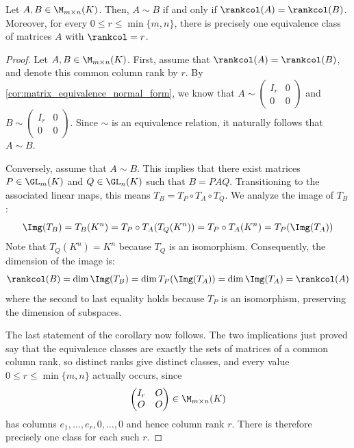 \begin{corollary}
\label{cor:matrix_rank_equivalence_classification}
Let $A, B \in \M_{m \times n}(K)$. Then, $A \sim B$ if and only if $\rankcol(A) = \rankcol(B)$. Moreover, for every $0 \le r \le \min\{m, n\}$, there is precisely one equivalence class of matrices $A$ with $\rankcol = r$.
\end{corollary}

\begin{proof}
Let $A, B \in \M_{m \times n}(K)$. First, assume that $\rankcol(A) = \rankcol(B)$, and denote this common column rank by $r$. By \cref{cor:matrix_equivalence_normal_form}, we know that $A \sim \left(\begin{smallmatrix} I_r & 0 \\ 0 & 0 \end{smallmatrix}\right)$ and $B \sim \left(\begin{smallmatrix} I_r & 0 \\ 0 & 0 \end{smallmatrix}\right)$. Since $\sim$ is an equivalence relation, it naturally follows that $A \sim B$.

Conversely, assume that $A \sim B$. This implies that there exist matrices $P \in \GL_m(K)$ and $Q \in \GL_n(K)$ such that $B = PAQ$. Transitioning to the associated linear maps, this means $T_B = T_P \circ T_A \circ T_Q$. We analyze the image of $T_B$:
\begin{equation*}
    \Img(T_B) = T_B(K^n) = T_P \circ T_A(T_Q(K^n)) = T_P \circ T_A(K^n) = T_P(\Img(T_A))
\end{equation*}
Note that $T_Q(K^n) = K^n$ because $T_Q$ is an isomorphism. Consequently, the dimension of the image is:
\begin{equation*}
    \rankcol(B) = \dim \Img(T_B) = \dim T_P(\Img(T_A)) = \dim \Img(T_A) = \rankcol(A)
\end{equation*}
where the second to last equality holds because $T_P$ is an isomorphism, preserving the dimension of subspaces.

The last statement of the corollary now follows. The two implications just proved say that the equivalence classes are exactly the sets of matrices of a common column rank, so distinct ranks give distinct classes, and every value $0 \le r \le \min\{m, n\}$ actually occurs, since
\[
\begin{pmatrix} I_r & O \\ O & O \end{pmatrix} \in \M_{m \times n}(K)
\]
has columns $e_1, \dots, e_r, 0, \dots, 0$ and hence column rank $r$. There is therefore precisely one class for each such $r$.
\end{proof}

